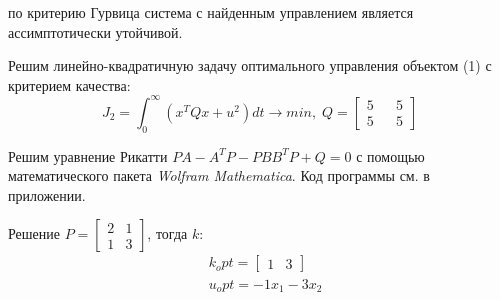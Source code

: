 \noindent по критерию Гурвица система с найденным управлением является ассимптотически утойчивой.


Решим линейно-квадратичную задачу оптимального управления объектом (1) с критерием качества:
$$
J_2=\int^{\infty}_0 (x^T Qx+u^2) dt \rightarrow min, \; Q = \begin{bmatrix}
    5 && 5 \\ 5 && 5
\end{bmatrix}
$$

Решим уравнение Рикатти $ PA - A^T P - PBB^T P + Q = 0 $ с помощью математического пакета \textit{Wolfram Mathematica}. Код программы см. в приложении.

Решение $ P = \begin{bmatrix} 2 & 1 \\ 1 & 3 \end{bmatrix} $, тогда $ k $:
\begin{align*}
    &k_opt = \begin{bmatrix}
        1 & 3
    \end{bmatrix} \\
    &u_opt = -1x_1 -3x_2
\end{align*}

